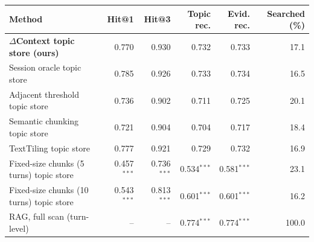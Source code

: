 \begin{tabular}{lrrrrr}
\toprule
Method & Hit@1 & Hit@3 & Topic rec. & Evid. rec. & Searched (\%) \\
\midrule
\textbf{$\Delta$Context topic store (ours)} & 0.770 & 0.930 & 0.732 & 0.733 & 17.1 \\
Session oracle topic store & 0.785 & 0.926 & 0.733 & 0.734 & 16.5 \\
Adjacent threshold topic store & 0.736 & 0.902 & 0.711 & 0.725 & 20.1 \\
Semantic chunking topic store & 0.721 & 0.904 & 0.704 & 0.717 & 18.4 \\
TextTiling topic store & 0.777 & 0.921 & 0.729 & 0.732 & 16.9 \\
Fixed-size chunks (5 turns) topic store & 0.457$^{***}$ & 0.736$^{***}$ & 0.534$^{***}$ & 0.581$^{***}$ & 23.1 \\
Fixed-size chunks (10 turns) topic store & 0.543$^{***}$ & 0.813$^{***}$ & 0.601$^{***}$ & 0.601$^{***}$ & 16.2 \\
RAG, full scan (turn-level) & -- & -- & 0.774$^{***}$ & 0.774$^{***}$ & 100.0 \\
\bottomrule
\end{tabular}
